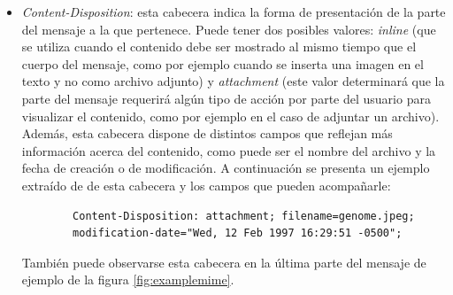\begin{itemize}
	\item\textit{Content-Disposition}: esta cabecera indica la forma de presentación de la parte del mensaje a la que pertenece. Puede tener dos posibles valores: \textit{inline} (que se utiliza cuando el contenido debe ser mostrado al mismo tiempo que el cuerpo del mensaje, como por ejemplo cuando se inserta una imagen en el texto y no como archivo adjunto) y \textit{attachment} (este valor determinará que la parte del mensaje requerirá algún tipo de acción por parte del usuario para visualizar el contenido, como por ejemplo en el caso de adjuntar un archivo). Además, esta cabecera dispone de distintos campos que reflejan más información acerca del contenido, como puede ser el nombre del archivo y la fecha de creación o de modificación. A continuación se presenta un ejemplo extraído de \cite{rfc2183} de esta cabecera y los campos que pueden acompañarle:
	
	\begin{lstlisting}
		Content-Disposition: attachment; filename=genome.jpeg;
		modification-date="Wed, 12 Feb 1997 16:29:51 -0500";
	\end{lstlisting}
	
	También puede observarse esta cabecera en la última parte del mensaje de ejemplo de la figura \ref{fig:examplemime}.
	

\end{itemize}
